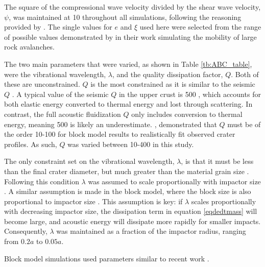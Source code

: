 

The square of the compressional wave velocity divided by the shear wave velocity, $\psi$, was maintained at 10 throughout all simulations, following the reasoning provided by \citet{collins2003acoustic}. The single values for $e$ and $\xi$ used here were selected from the range of possible values demonstrated by \citet{collins2003acoustic} in their work simulating the mobility of large rock avalanches. 

The two main parameters that were varied, as shown in Table \ref{tb:ABC_table}, were the vibrational wavelength, $\lambda$, and the quality dissipation factor, $Q$. Both of these are unconstrained. $Q$ is the most constrained as it is similar to the seismic $Q$ \citep{melosh1996dynamical}. A typical value of the seismic $Q$ in the upper crust is 500 \citep{anderson1989theory}, which accounts for both elastic energy converted to thermal energy and lost through scattering. In contrast, the full acoustic fluidization $Q$ only includes conversion to thermal energy, meaning 500 is likely an underestimate. \citet{melosh1999impact}, demonstrated that $Q$ must be of the order 10-100 for block model results to realistically fit observed crater profiles. As such, $Q$ was varied between 10-400 in this study. 

The only constraint set on the vibrational wavelength, $\lambda$, is that it must be less than the final crater diameter, but much greater than the material grain size \citep{melosh1979acoustic,collins2002numerical}. Following this condition $\lambda$ was assumed to scale proportionally with impactor size \citep{collins2003acoustic}. A similar assumption is made in the block model, where the block size is also proportional to impactor size \citep{ivanov1997block}. This assumption is key: if $\lambda$ scales proportionally with decreasing impactor size, the dissipation term in equation \ref{eqdedtmass} will become large, and acoustic energy will dissipate more rapidly for smaller impacts. Consequently, $\lambda$ was maintained as a fraction of the impactor radius, ranging from $0.2a$ to $0.05a$.

Block model simulations used parameters similar to recent work \citetext{e.g., \citet{wunnemann2003numerical}}. 
